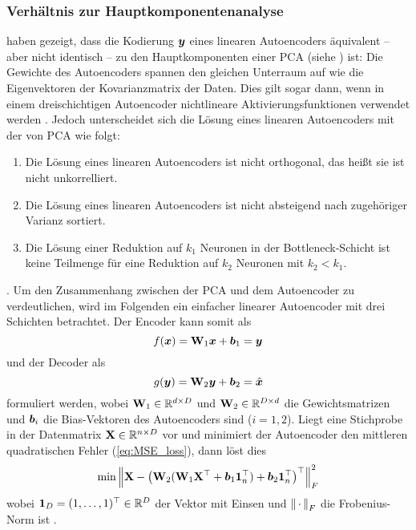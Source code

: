 \subsubsection{Verhältnis zur Hauptkomponentenanalyse}
\label{ch:MethodenDerDimRed:ML:AE:VerhaeltnisPCA}

\textcites{Baldi.1989}{Bourlard.1988} haben gezeigt, dass die Kodierung $\bm{y}$ eines linearen Autoencoders äquivalent -- aber nicht identisch -- zu den Hauptkomponenten einer PCA (siehe ) ist: Die Gewichte des Autoencoders spannen den gleichen Unterraum auf wie die Eigenvektoren der Kovarianzmatrix der Daten. Dies gilt sogar dann, wenn in einem dreischichtigen Autoencoder nichtlineare Aktivierungsfunktionen verwendet werden \parencite[291, 293]{Bourlard.1988}. Jedoch unterscheidet sich die Lösung eines linearen Autoencoders
mit der von PCA wie folgt:
\begin{enumerate}
	\item Die Lösung eines linearen Autoencoders ist nicht orthogonal, das heißt sie ist nicht unkorrelliert.
	\item Die Lösung eines linearen Autoencoders ist nicht absteigend nach zugehöriger Varianz sortiert.
	\item Die Lösung einer Reduktion auf $k_1$ Neuronen in der Bottleneck-Schicht ist keine Teilmenge für
	      eine Reduktion auf $k_2$ Neuronen mit $k_2 < k_1$.
\end{enumerate}
\parencite[3]{Plaut.2018}. Um den Zusammenhang zwischen der PCA und dem Autoencoder zu verdeutlichen,
wird im Folgenden ein einfacher linearer Autoencoder mit drei Schichten betrachtet. Der Encoder
kann somit als
\begin{equation}
	f(\bm{x}) = \mathbf{W}_1 \bm{x} + \bm{b}_1 = \bm{y}
\end{equation}
und der Decoder als
\begin{equation}
	g(\bm{y}) = \mathbf{W}_2 \bm{y} + \bm{b}_2 = \hat{\bm{x}}
\end{equation}
formuliert werden, wobei $\mathbf{W}_1 \in \mathbb{R}^{d \times D}$ und $\mathbf{W}_2 \in \mathbb{R}^{D \times d}$ die Gewichtsmatrizen und $\bm{b}_i$ die Bias-Vektoren des Autoencoders sind ($i = 1, 2$). Liegt eine Stichprobe in der Datenmatrix $\mathbf{X} \in \mathbb{R}^{n \times D}$ vor und minimiert der Autoencoder den mittleren quadratischen Fehler (\eqref{eq:MSE_loss}), dann löst dies
\begin{equation}
	\min \left\lVert \mathbf{X} - \left( \mathbf{W}_2( \mathbf{W}_1 \mathbf{X}^\top + \bm{b}_1 \bm{1}_n^\top) + \bm{b}_2 \bm{1}_n^\top  \right) ^\top \right\rVert^2_F
\end{equation}
wobei $\bm{1}_D = (1, \ldots, 1)^\top \in \mathbb{R}^D$ der Vektor mit Einsen und $\left\lVert\,\cdot\,\right\rVert_F$ die Frobenius-Norm ist \parencite[3]{Plaut.2018}.
